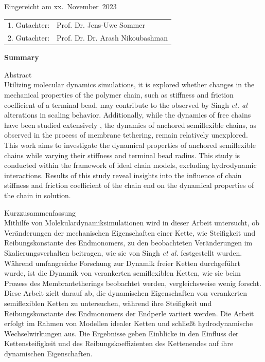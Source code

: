 \documentclass[
    paper=A4,pagesize=automedia,fontsize=12pt,
    BCOR=15mm,DIV=22,
    twoside,headinclude,footinclude=false,
    fleqn,             %
    bibliography=totocnumbered,          %
    listof=totoc,                %
    listof=flat,                 %
    cleardoublepage=empty      %
    numbers=endperiod
]{scrartcl}
\begin{document}
\thispagestyle{empty}\vspace*{48em}

Eingereicht am xx.~November~2023\vspace{1.5em}
\par{\large\begin{tabular}{ll}
        1. Gutachter: & Prof. Dr. Jens-Uwe Sommer \\
        2. Gutachter: & Prof. Dr. Dr. Arash Nikoubashman \\
    \end{tabular}}


\newpage
\begin{center}\large\bfseries Summary\end{center}


Abstract \\
Utilizing molecular dynamics simulations, it is explored whether changes 
in the mechanical properties of the polymer chain, such as 
stiffness and friction coefficient of a terminal bead, may contribute to the 
observed by Singh \emph{et. al} \cite{Singh:2022} alterations in scaling behavior. 
Additionally, while the dynamics of free chains have been studied extensively 
\cite{Nikoubashman2016} \cite{Singh:2022}, 
the dynamics of anchored semiflexible chains, as observed in the process of 
membrane tethering, remain relatively unexplored. This work aims to investigate 
the dynamical properties of anchored semiflexible chains while varying their 
stiffness and terminal bead radius. This study is conducted within the 
framework of ideal chain models, 
excluding hydrodynamic interactions. Results of this study reveal insights 
into the influence of chain stiffness and friction coefficient of the chain end
on the dynamical properties of the chain in solution.


\vspace{15em}
Kurzzusammenfassung \\
Mithilfe von Molekulardynamiksimulationen wird in dieser Arbeit untersucht, 
ob Veränderungen der mechanischen Eigenschaften einer Kette, 
wie Steifigkeit und Reibungskonstante des Endmonomers, 
zu den beobachteten Veränderungen im Skalierungsverhalten beitragen, 
wie sie von Singh \emph{et al.} \cite{Singh:2022} festgestellt wurden. 
Während umfangreiche Forschung zur Dynamik freier Ketten 
durchgeführt wurde, ist die Dynamik von verankerten semiflexiblen Ketten, 
wie sie beim Prozess des Membrantetherings beobachtet werden, 
vergleichsweise wenig forscht. Diese Arbeit zielt darauf ab, die dynamischen 
Eigenschaften von verankerten semiflexiblen Ketten zu untersuchen, 
während ihre Steifigkeit und Reibungskonstante des Endmonomers der Endperle 
variiert werden. Die Arbeit erfolgt im Rahmen von Modellen idealer Ketten und schließt 
hydrodynamische Wechselwirkungen aus. Die Ergebnisse geben Einblicke in den 
Einfluss der Kettensteifigkeit und des Reibungskoeffizienten des Kettenendes auf 
ihre dynamischen Eigenschaften.
\end{document}

